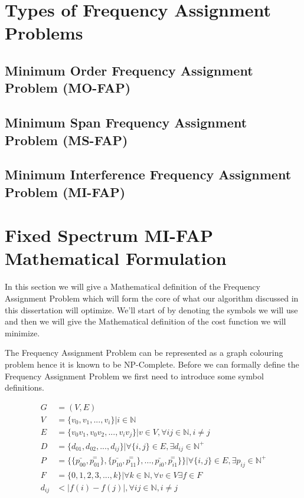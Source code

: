 \section{Types of Frequency Assignment Problems}
\subsection{Minimum Order Frequency Assignment Problem (MO-FAP)}
\subsection{Minimum Span Frequency Assignment Problem (MS-FAP)}
\subsection{Minimum Interference Frequency Assignment Problem (MI-FAP)}
\section{Fixed Spectrum MI-FAP Mathematical Formulation}
In this section we will give a Mathematical definition of the Frequency Assignment Problem which will form the core of what our algorithm discussed in this dissertation will optimize. We'll start of by denoting the symbols we will use and then we will give the Mathematical definition of the cost function we will minimize.

The Frequency Assignment Problem can be represented as a graph colouring problem hence it is known to be NP-Complete. Before we can formally define the Frequency Assignment Problem we first need to introduce some symbol definitions.

\begin{align}
	G &= (V,E) \label{E:setG}\\
	V &= \{v_{0},v_{1},...,v_{i}\} | i \in \mathbb{N} \label{E:setV}\\
	E &= \{v_0v_1,v_0v_2,...,v_iv_j\}|v \in V,\forall ij \in \mathbb{N},i \neq j \label{E:setE}\\
	D &= \{d_{01},d_{02},...,d_{ij}\}| \forall\{i,j\} \in E, \exists d_{ij} \in \mathbb{N}^+ \label{E:setD}\\
	P &= \{\{\bar{p_{00}},\overset{=}{p_{01}}\},\{\bar{p_{10}},\overset{=}{p_{11}}\},\ldots,\bar{p_{i0}},\overset{=}{p_{i1}}\}\}| \forall \{i,j\} \in E,\exists p_{ij} \in \mathbb{N}^+ \label{E:setP}\\
	F &= \{0,1,2,3,...,k\}| \forall k \in \mathbb{N},\forall v \in V \exists f \in F\label{E:setF}\\
	d_{ij} &< |f(i) - f(j)|, \forall ij \in \mathbb{N},i \neq j \label{E:interference}
\end{align}

